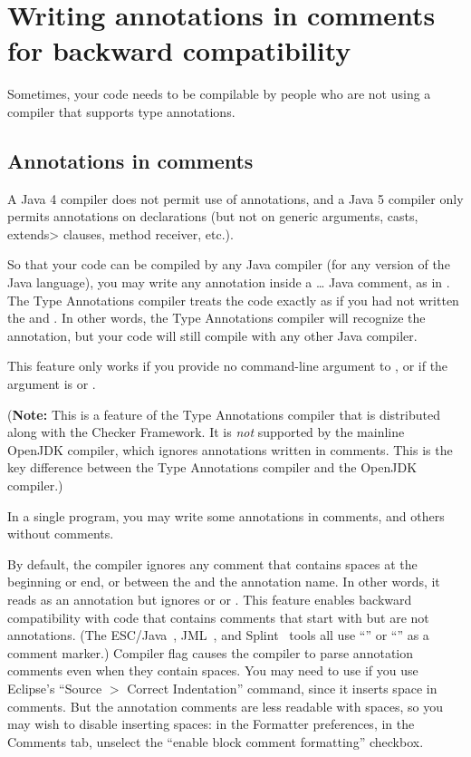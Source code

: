 \section{Writing annotations in comments for backward compatibility\label{annotations-in-comments}}

Sometimes, your code needs to be compilable by people who are not
using a compiler that supports type annotations.


\subsection{Annotations in comments}

A Java 4 compiler does not permit use of
annotations, and a Java 5 compiler only permits annotations on
declarations (but not on generic arguments, casts, \<extends> clauses, method receiver, etc.).

So that your code can be compiled by any Java compiler (for any version of
the Java language), you may write any annotation inside a
\code{/*}\ldots\code{*/} Java comment, as in .
The Type Annotations compiler treats the code exactly as if you had not written the
\code{/*} and \code{*/}.
In other words, the Type Annotations compiler will recognize the
annotation, but your code will still compile with any other Java compiler.

This feature only works if you provide no  command-line
argument to , or if the  argument is 
or .

(\textbf{Note:} This is a feature of the Type Annotations compiler that is
distributed along with the Checker Framework.  It is \emph{not} supported by the
mainline OpenJDK compiler, which ignores annotations written in
comments.  This is the key difference between the Type Annotations
compiler and the OpenJDK compiler.)

In a single program, you may write some annotations in comments, and others
without comments.

By default, the compiler ignores any comment that contains spaces at the
beginning or end, or between the  and the annotation name.
In other words, it reads  as an annotation but ignores
 or  or .
This
feature enables backward compatibility with code that contains comments
that start with  but are not annotations.  (The
ESC/Java~\cite{FlanaganLLNSS02}, JML~\cite{LeavensBR2006:JML}, and
Splint~\cite{Evans96} tools all use ``'' or ``'' as a
comment marker.)
Compiler flag
 causes the compiler to parse annotation comments
even when they contain spaces.  You may need to use
 if you use Eclipse's ``Source $>$ Correct
Indentation'' command, since it inserts space in comments.  But the
annotation comments are less readable with spaces, so you may wish to disable
inserting spaces:  in the Formatter preferences, in the Comments tab,
unselect the ``enable block comment formatting'' checkbox.


